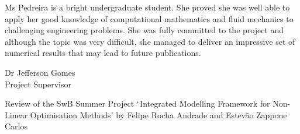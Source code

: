 \documentclass[14pt,twoside]{report}
\begin{document}
Ms Pedreira is a bright undergraduate student. She proved she was well able to apply her good knowledge of computational mathematics and fluid mechanics to challenging engineering problems. She was fully committed to the project and although the topic was very difficult, she managed to deliver an impressive set of numerical results that may lead to future publications. 
\vspace{2.cm}
\begin{center}
{Dr Jefferson Gomes}\\
{Project Supervisor}\\
\end{center}

\clearpage




\medskip

\begin{center}
{\large Review of the SwB Summer Project $\lq$Integrated Modelling Framework for Non-Linear Optimisation Methods' by Felipe Rocha Andrade and Estev\~ao Zappone Carlos}
\end{center}
\end{document}
